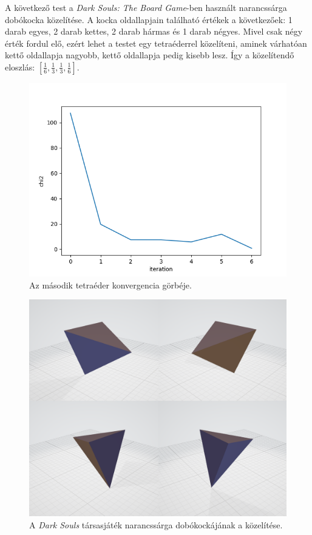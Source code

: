 A következő test a \textit{Dark Souls: The Board Game}-ben \cite{darksouls} használt narancssárga dobókocka közelítése.
A kocka oldallapjain található értékek a következőek: 1 darab egyes, 2 darab kettes, 2 darab hármas és 1 darab négyes.
Mivel csak négy érték fordul elő, ezért lehet a testet egy tetraéderrel közelíteni, aminek várhatóan kettő oldallapja nagyobb, kettő oldallapja pedig kisebb lesz.
Így a közelítendő eloszlás: $[\frac{1}{6}, \frac{1}{3}, \frac{1}{3}, \frac{1}{6}]$.

\begin{figure}[h!]
	\centering
	\includegraphics[scale=0.7]{images/tetrahedron_02.png}
	\caption{Az második tetraéder konvergencia görbéje.}
	\label{fig:tetra02}
\end{figure}

\begin{figure}[h!]
	\centering
	\includegraphics[width=\textwidth]{images/tetra02obj.png}
	\caption{A \textit{Dark Souls} társasjáték narancssárga dobókockájának a közelítése.}
	\label{fig:tetra02obj}
\end{figure}

